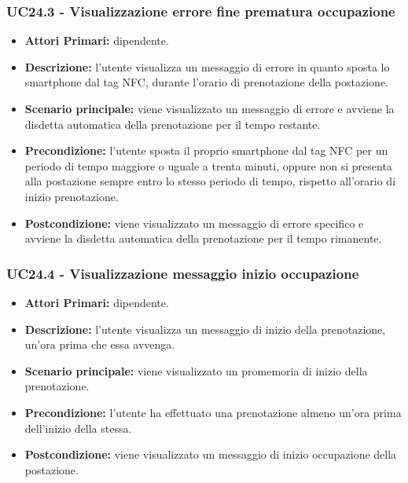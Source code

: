 \subsubsection{ UC24.3 - Visualizzazione errore fine prematura occupazione}
\begin{itemize}
	\item\textbf{Attori Primari:} dipendente.
	\item\textbf{Descrizione:} l’utente visualizza un messaggio di errore in quanto sposta lo smartphone dal tag NFC, durante l'orario di prenotazione della postazione.
	\item\textbf{Scenario principale:} viene visualizzato un messaggio di errore e avviene la disdetta automatica della prenotazione per il tempo restante.
	\item\textbf{Precondizione:} l’utente sposta il proprio smartphone dal tag NFC per un periodo di tempo maggiore o uguale a trenta minuti, oppure non si presenta alla postazione sempre entro lo stesso periodo di tempo, rispetto all'orario di inizio prenotazione. 
	\item\textbf{Postcondizione:} viene visualizzato un messaggio di errore specifico e avviene la disdetta automatica della prenotazione per il tempo rimanente.
\end{itemize}

\subsubsection{ UC24.4 - Visualizzazione messaggio inizio occupazione}
\begin{itemize}
	\item\textbf{Attori Primari:} dipendente.
	\item\textbf{Descrizione:} l’utente visualizza un messaggio di inizio della prenotazione, un'ora prima che essa avvenga.
	\item\textbf{Scenario principale:} viene visualizzato un promemoria di inizio della prenotazione.
	\item\textbf{Precondizione:} l’utente ha effettuato una prenotazione almeno un'ora prima dell'inizio della stessa.
	\item\textbf{Postcondizione:} viene visualizzato un messaggio di inizio occupazione della postazione.
\end{itemize}

